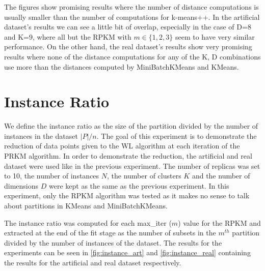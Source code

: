The figures show promising results where the number of distance computations is usually smaller than the number of computations for k-means++. In the artificial dataset's results we can see a little bit of overlap, especially in the case of D=8 and K=9, where all but the RPKM with $m \in \{1,2,3\}$ seem to have very similar performance. On the other hand, the real dataset's results show very promising results where none of the distance computations for any of the K, D combinations use more than the distances computed by MiniBatchKMeans and KMeans.

\section{Instance Ratio}

We define the instance ratio as the size of the partition divided by the number of instances in the dataset $|P|/n$. The goal of this experiment is to demonstrate the reduction of data points given to the WL algorithm at each iteration of the PRKM algorithm. In order to demonstrate the reduction, the artificial and real dataset were used like in the previous experiment. The number of replicas was set to 10, the number of instances $N$, the number of clusters $K$ and the number of dimensions $D$ were kept as the same as the previous experiment. In this experiment, only the RPKM algorithm was tested as it makes no sense to talk about partitions in KMeans and MiniBatchKMeans.

The instance ratio was computed for each max\_iter ($m$) value for the RPKM and extracted at the end of the fit stage as the number of subsets in the $m^{th}$ partition divided by the number of instances of the dataset. The results for the experiments can be seen in \ref{fig:instance_art} and \ref{fig:instance_real} containing the results for the artificial and real dataset respectively.

